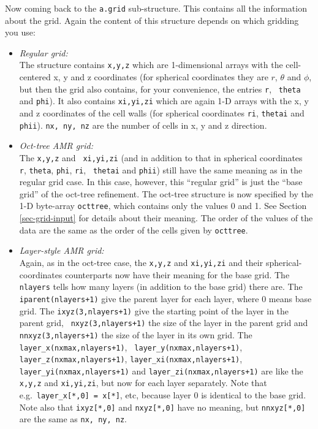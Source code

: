 \documentclass{report}
\begin{document}
Now coming back to the {\small\tt a.grid} sub-structure. This contains
all the information about the grid. Again the content of this structure
depends on which gridding you use:
\begin{itemize}
\item {\em Regular grid:}\\ The structure contains {\small\tt x,y,z} which are
  1-dimensional arrays with the cell-centered x, y and z coordinates (for
  spherical coordinates they are $r$, $\theta$ and $\phi$, but then the grid
  also contains, for your convenience, the entries {\small\tt r}, {\small\tt
    theta} and {\small\tt phi}). It also contains {\small\tt xi,yi,zi} which
  are again 1-D arrays with the x, y and z coordinates of the cell walls
  (for spherical coordinates {\small\tt ri}, {\small\tt thetai} and
  {\small\tt phii}). {\small\tt nx, ny, nz} are the number of cells in 
  x, y and z direction.
\item {\em Oct-tree AMR grid:}\\ The {\small\tt x,y,z} and {\small\tt
    xi,yi,zi} (and in addition to that in spherical coordinates {\small\tt
    r}, {\small\tt theta}, {\small\tt phi}, {\small\tt ri}, {\small\tt
    thetai} and {\small\tt phii}) still have the same meaning as in the
  regular grid case. In this case, however, this ``regular grid'' is just
  the ``base grid'' of the oct-tree refinement. The oct-tree structure is
  now specified by the 1-D byte-array {\small\tt octtree}, which contains
  only the values 0 and 1. See Section \ref{sec-grid-input} for details
  about their meaning. The order of the values of the data are the same
  as the order of the cells given by {\small\tt octtree}.
\item {\em Layer-style AMR grid:}\\ Again, as in the oct-tree case, the
  {\small\tt x,y,z} and {\small\tt xi,yi,zi} and their spherical-coordinates
  counterparts now have their meaning for the base grid. The {\small\tt
    nlayers} tells how many layers (in addition to the base grid) there
  are. The {\small\tt iparent(nlayers+1)} give the parent layer for each
  layer, where 0 means base grid. The {\small\tt ixyz(3,nlayers+1)} give the
  starting point of the layer in the parent grid, {\small\tt
    nxyz(3,nlayers+1)} the size of the layer in the parent grid and
  {\small\tt nnxyz(3,nlayers+1)} the size of the layer in its own grid.  The
  {\small\tt layer\_x(nxmax,nlayers+1)}, {\small\tt
    layer\_y(nxmax,nlayers+1)}, {\small\tt layer\_z(nxmax,nlayers+1)},
  {\small\tt layer\_xi(nxmax,nlayers+1)}, {\small\tt
    layer\_yi(nxmax,nlayers+1)} and {\small\tt layer\_zi(nxmax,nlayers+1)}
  are like the {\small\tt x,y,z} and {\small\tt xi,yi,zi}, but now for each
  layer separately. Note that e.g.\ {\small\tt layer\_x[*,0] = x[*]}, etc,
  because layer 0 is identical to the base grid. Note also that 
  {\small\tt ixyz[*,0]} and {\small\tt nxyz[*,0]} have no meaning, but
  {\small\tt nnxyz[*,0]} are the same as {\small\tt nx, ny, nz}. 
\end{itemize}
\end{document}
